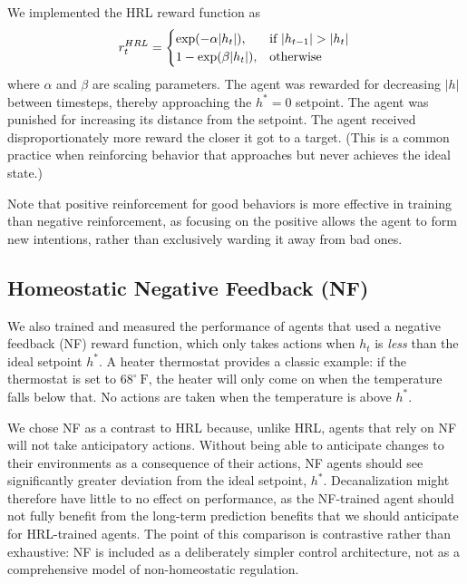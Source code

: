 We implemented the HRL reward function as
\begin{equation*}
    r^{HRL}_t =
    \begin{cases}
        \exp(-\alpha|h_t|),   & \text{if } |h_{t-1}| > |h_t| \\
        1 - \exp(\beta|h_t|), & \text{otherwise}             \\
    \end{cases} \\
\end{equation*}
where \(\alpha\) and \(\beta\) are scaling parameters. The agent was rewarded for decreasing \(|h|\) between timesteps, thereby approaching the \(h^*=0\) setpoint. The agent was punished for increasing its distance from the setpoint. The agent received disproportionately more reward the closer it got to a target. (This is a common practice when reinforcing behavior that approaches but never achieves the ideal state.)

Note that positive reinforcement for good behaviors is more effective in training than negative reinforcement, as focusing on the positive allows the agent to form new intentions, rather than exclusively warding it away from bad ones.

\subsection{Homeostatic Negative Feedback (NF)}

We also trained and measured the performance of agents that used a negative feedback (NF) reward function, which only takes actions when \(h_t\) is \emph{less} than the ideal setpoint \(h^*\). A heater thermostat provides a classic example: if the thermostat is set to $68^\circ\ \mathrm{F}$, the heater will only come on when the temperature falls below that. No actions are taken when the temperature is above \(h^*\).

We chose NF as a contrast to HRL because, unlike HRL, agents that rely on NF will not take anticipatory actions. Without being able to anticipate changes to their environments as a consequence of their actions, NF agents should see significantly greater deviation from the ideal setpoint, \(h^*\). Decanalization might therefore have little to no effect on performance, as the NF-trained agent should not fully benefit from the long-term prediction benefits that we should anticipate for HRL-trained agents. The point of this comparison is contrastive rather than exhaustive: NF is included as a deliberately simpler control architecture, not as a comprehensive model of non-homeostatic regulation.

